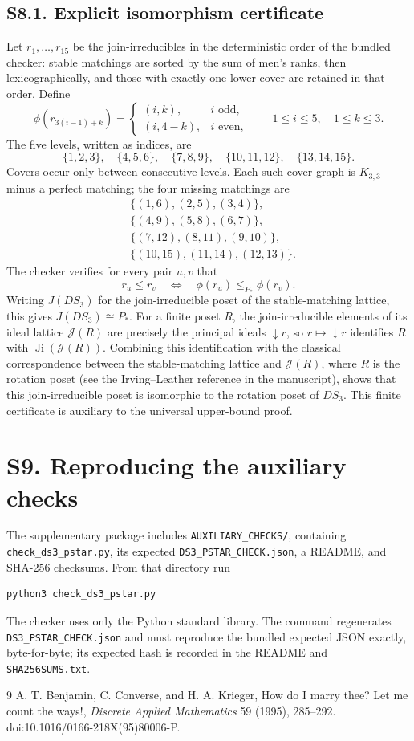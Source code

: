 \documentclass[11pt]{article}
\begin{document}
\subsection*{S8.1. Explicit isomorphism certificate}
Let $r_1,\ldots,r_{15}$ be the join-irreducibles in the deterministic order
of the bundled checker: stable matchings are sorted by the sum of men's
ranks, then lexicographically, and those with exactly one lower cover are
retained in that order.  Define
\[
\phi(r_{3(i-1)+k})=
\begin{cases}
(i,k),&i\text{ odd},\\
(i,4-k),&i\text{ even},
\end{cases}
\qquad 1\le i\le5,\quad 1\le k\le3.
\]
The five levels, written as indices, are
\[
\{1,2,3\},\quad\{4,5,6\},\quad\{7,8,9\},\quad
\{10,11,12\},\quad\{13,14,15\}.
\]
Covers occur only between consecutive levels.  Each such cover graph is
$K_{3,3}$ minus a perfect matching; the four missing matchings are
\[
\begin{aligned}
&\{(1,6),(2,5),(3,4)\},\\
&\{(4,9),(5,8),(6,7)\},\\
&\{(7,12),(8,11),(9,10)\},\\
&\{(10,15),(11,14),(12,13)\}.
\end{aligned}
\]
The checker verifies for every pair $u,v$ that
\[
r_u\le r_v\quad\Longleftrightarrow\quad
\phi(r_u)\le_{P_*}\phi(r_v).
\]
Writing $J(DS_3)$ for the join-irreducible poset of the stable-matching
lattice, this gives $J(DS_3)\cong P_*$.
For a finite poset $R$, the join-irreducible elements of its ideal lattice
$\mathcal J(R)$ are precisely the principal ideals $\downarrow r$, so
$r\mapsto\downarrow r$ identifies $R$ with
$\operatorname{Ji}(\mathcal J(R))$.
Combining this identification with the classical correspondence between
the stable-matching lattice and $\mathcal J(R)$, where $R$ is the rotation
poset (see the Irving--Leather reference in the manuscript), shows that
this join-irreducible poset is isomorphic to the rotation poset of $DS_3$.
This finite certificate is auxiliary to the universal upper-bound proof.

\section*{S9. Reproducing the auxiliary checks}
The supplementary package includes \texttt{AUXILIARY\_CHECKS/}, containing
\texttt{check\_ds3\_pstar.py}, its expected \texttt{DS3\_PSTAR\_CHECK.json},
a README, and SHA-256 checksums.  From that directory run
\begin{verbatim}
python3 check_ds3_pstar.py
\end{verbatim}
The checker uses only the Python standard library.  The command regenerates\newline
\texttt{DS3\_PSTAR\_CHECK.json} and must reproduce the bundled expected JSON
exactly, byte-for-byte; its expected hash is recorded in the README and
\texttt{SHA256SUMS.txt}.

\begin{thebibliography}{9}
A. T. Benjamin, C. Converse, and H. A. Krieger,
How do I marry thee? Let me count the ways!,
\emph{Discrete Applied Mathematics} 59 (1995), 285--292.
doi:10.1016/0166-218X(95)80006-P.
\end{thebibliography}
\end{document}
